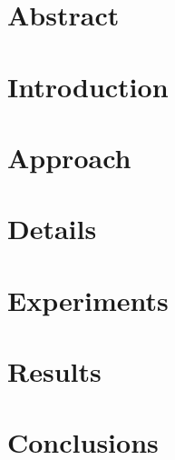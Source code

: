 \section*{Abstract}


\section{Introduction}


\section{Approach}


\section{Details}


\section{Experiments}


\section{Results}


\section{Conclusions}

